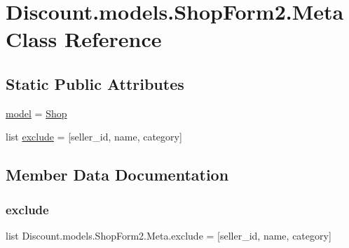 \hypertarget{class_discount_1_1models_1_1_shop_form2_1_1_meta}{}\section{Discount.\+models.\+Shop\+Form2.\+Meta Class Reference}
\label{class_discount_1_1models_1_1_shop_form2_1_1_meta}
\subsection*{Static Public Attributes}
\begin{DoxyCompactItemize}
\item 
\hyperlink{class_discount_1_1models_1_1_shop_form2_1_1_meta_a68fe39fa27728f5b109f9839e633e19e}{model} = \hyperlink{class_discount_1_1models_1_1_shop}{Shop}
\item 
list \hyperlink{class_discount_1_1models_1_1_shop_form2_1_1_meta_a161dc6e1d27d9fd64b1e41560553ae24}{exclude} = \mbox{[}\textquotesingle{}seller\+\_\+id\textquotesingle{}, \textquotesingle{}name\textquotesingle{}, \textquotesingle{}category\textquotesingle{}\mbox{]}
\end{DoxyCompactItemize}


\subsection{Member Data Documentation}
\mbox{\label{class_discount_1_1models_1_1_shop_form2_1_1_meta_a161dc6e1d27d9fd64b1e41560553ae24}} 
\subsubsection{\texorpdfstring{exclude}{exclude}}
{\footnotesize\ttfamily list Discount.\+models.\+Shop\+Form2.\+Meta.\+exclude = \mbox{[}\textquotesingle{}seller\+\_\+id\textquotesingle{}, \textquotesingle{}name\textquotesingle{}, \textquotesingle{}category\textquotesingle{}\mbox{]}\hspace{0.3cm}{\ttfamily [static]}}

\mbox{\label{class_discount_1_1models_1_1_shop_form2_1_1_meta_a68fe39fa27728f5b109f9839e633e19e}} 
